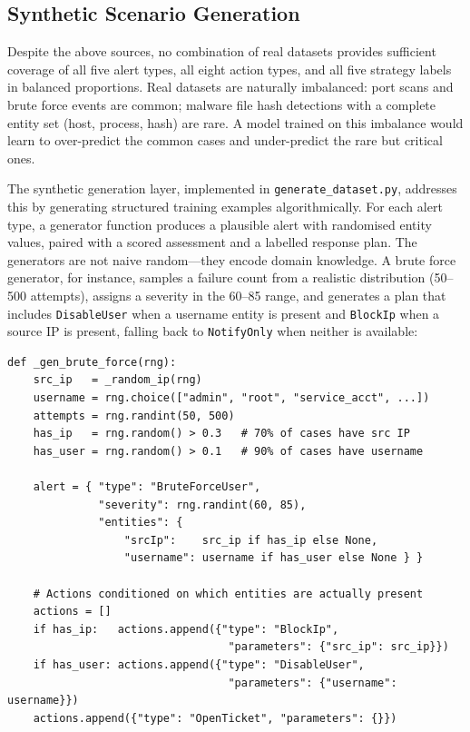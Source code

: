 \subsection{Synthetic Scenario Generation}

Despite the above sources, no combination of real datasets provides sufficient coverage of all five alert types, all eight action types, and all five strategy labels in balanced proportions. Real datasets are naturally imbalanced: port scans and brute force events are common; malware file hash detections with a complete entity set (host, process, hash) are rare. A model trained on this imbalance would learn to over-predict the common cases and under-predict the rare but critical ones.

The synthetic generation layer, implemented in \texttt{generate\_dataset.py}, addresses this by generating structured training examples algorithmically. For each alert type, a generator function produces a plausible alert with randomised entity values, paired with a scored assessment and a labelled response plan. The generators are not naive random---they encode domain knowledge. A brute force generator, for instance, samples a failure count from a realistic distribution (50--500 attempts), assigns a severity in the 60--85 range, and generates a plan that includes \texttt{DisableUser} when a username entity is present and \texttt{BlockIp} when a source IP is present, falling back to \texttt{NotifyOnly} when neither is available:

\begin{verbatim}
def _gen_brute_force(rng):
    src_ip   = _random_ip(rng)
    username = rng.choice(["admin", "root", "service_acct", ...])
    attempts = rng.randint(50, 500)
    has_ip   = rng.random() > 0.3   # 70% of cases have src IP
    has_user = rng.random() > 0.1   # 90% of cases have username

    alert = { "type": "BruteForceUser",
              "severity": rng.randint(60, 85),
              "entities": {
                  "srcIp":    src_ip if has_ip else None,
                  "username": username if has_user else None } }

    # Actions conditioned on which entities are actually present
    actions = []
    if has_ip:   actions.append({"type": "BlockIp",
                                  "parameters": {"src_ip": src_ip}})
    if has_user: actions.append({"type": "DisableUser",
                                  "parameters": {"username": username}})
    actions.append({"type": "OpenTicket", "parameters": {}})
\end{verbatim}

